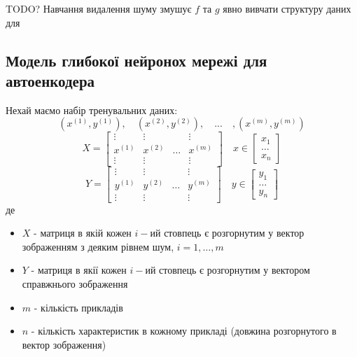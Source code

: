 \documentclass[14pt,a4paper]{extarticle}
\newcounter{e}
\numberwithin{equation}{section}
\numberwithin{figure}{section}
\begin{document}
	TODO?
	Навчання видалення шуму змушує $f$ та $g$ явно вивчати структуру даних для 	
	
	\newpage
	\subsection{Модель глибокої нейронох мережі для автоенкодера}
	Нехай маємо набір тренувальних даних:
	\begin{equation*}
		(x^{(1)}, y^{(1)}), \quad (x^{(2)}, y^{(2)}), \quad ... \quad ,(x^{(m)}, y^{(m)})
	\end{equation*}
	\begin{equation*}
		\quad
		X =	
		\begin{bmatrix}
			\vdots  & \vdots  & & \vdots \\
			x^{(1)} & x^{(2)} &   \dots & x^{(m)}\\
			\vdots  & \vdots  & & \vdots
		\end{bmatrix}
		\quad
		x \in
		\begin{bmatrix}
			x_1   \\
			\dots \\
			x_n
		\end{bmatrix}
		\quad
	\end{equation*}
	\begin{equation*}
		\quad
		Y =	
		\begin{bmatrix}
			\vdots  & \vdots  & & \vdots \\
			y^{(1)} & y^{(2)} &   \dots & y^{(m)}\\
			\vdots  & \vdots  & & \vdots
		\end{bmatrix}
		\quad
		y \in
		\begin{bmatrix}
			y_1   \\
			\dots \\
			y_n
		\end{bmatrix}
		\quad
	\end{equation*}
	де
	\begin{itemize}
	\item $X$ - матриця в якій кожен $i-$ий стовпець є розгорнутим у вектор зображенням з деяким рівнем шум,  \newline $i=1,\dots,m$
	\item $Y$ - матриця в якії кожен $i-$ий стовпець є розгорнутим у вектором справжнього зображення
	\item $m$ - кількість прикладів
	\item $n$ - кількість характеристик в кожному прикладі (довжина розгорнутого в вектор зображення)
	\end{itemize}
\end{document}
